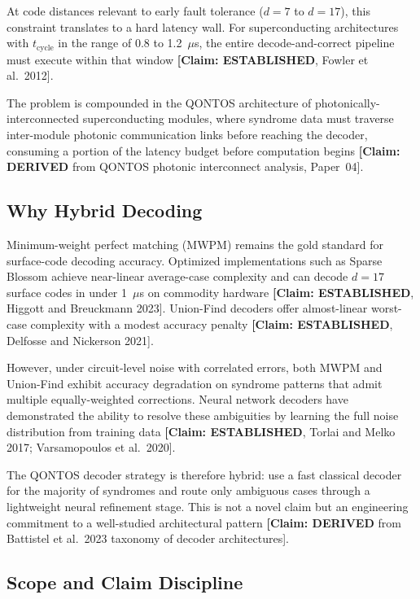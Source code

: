 \documentclass[conference]{IEEEtran}
\begin{document}
At code distances relevant to early fault tolerance ($d = 7$ to $d = 17$), this constraint translates to a hard latency wall. For superconducting architectures with $t_{\text{cycle}}$ in the range of 0.8 to 1.2~$\mu$s, the entire decode-and-correct pipeline must execute within that window \textbf{[Claim: ESTABLISHED}, Fowler et al.\ 2012].

The problem is compounded in the QONTOS architecture of photonically-interconnected superconducting modules, where syndrome data must traverse inter-module photonic communication links before reaching the decoder, consuming a portion of the latency budget before computation begins \textbf{[Claim: DERIVED} from QONTOS photonic interconnect analysis, Paper~04].

\subsection{Why Hybrid Decoding}

Minimum-weight perfect matching (MWPM) remains the gold standard for surface-code decoding accuracy. Optimized implementations such as Sparse Blossom achieve near-linear average-case complexity and can decode $d = 17$ surface codes in under 1~$\mu$s on commodity hardware \textbf{[Claim: ESTABLISHED}, Higgott and Breuckmann 2023]. Union-Find decoders offer almost-linear worst-case complexity with a modest accuracy penalty \textbf{[Claim: ESTABLISHED}, Delfosse and Nickerson 2021].

However, under circuit-level noise with correlated errors, both MWPM and Union-Find exhibit accuracy degradation on syndrome patterns that admit multiple equally-weighted corrections. Neural network decoders have demonstrated the ability to resolve these ambiguities by learning the full noise distribution from training data \textbf{[Claim: ESTABLISHED}, Torlai and Melko 2017; Varsamopoulos et al.\ 2020].

The QONTOS decoder strategy is therefore hybrid: use a fast classical decoder for the majority of syndromes and route only ambiguous cases through a lightweight neural refinement stage. This is not a novel claim but an engineering commitment to a well-studied architectural pattern \textbf{[Claim: DERIVED} from Battistel et al.\ 2023 taxonomy of decoder architectures].

\subsection{Scope and Claim Discipline}
\end{document}
